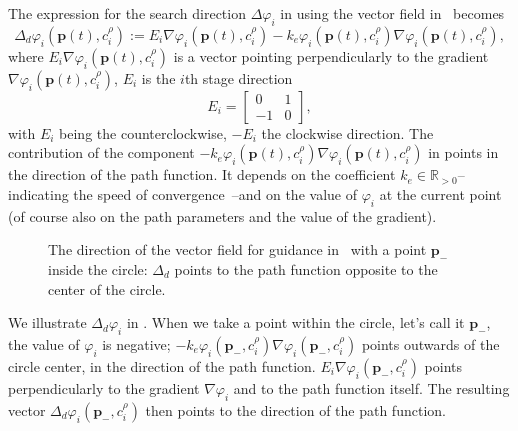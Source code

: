 The expression for the search direction $\Delta\varphi_i$ in  using the vector field in~\citep{de2017guidance} becomes
\begin{equation}\label{eq:pd}
  \Delta_d\varphi_i(\mathbf{p}(t),c_i^\rho):=E_i\nabla\varphi_i(\mathbf{p}(t),c_i^\rho)-k_e\varphi_i(\mathbf{p}(t),c_i^\rho)\nabla\varphi_i(\mathbf{p}(t),c_i^\rho),
\end{equation}
where $E_i\nabla\varphi_i(\mathbf{p}(t),c_i^\rho)$ is a vector pointing perpendicularly to the gradient $\nabla\varphi_i(\mathbf{p}(t),c_i^\rho)$, $E_i$ is the $i$th stage direction
\begin{equation}
  E_i=\begin{bmatrix}
    0&1\\-1&0
  \end{bmatrix},
\end{equation}
with $E_i$ being the counterclockwise, $-E_i$ the clockwise direction. 
The contribution of the component $-k_e\varphi_i(\mathbf{p}(t),c_i^\rho)\nabla\varphi_i(\mathbf{p}(t),c_i^\rho)$ in  points in the direction of the path function. It depends on the coefficient $k_e\in\mathbb{R}_{>0}$--indicating the speed of convergence~\citep{de2017guidance}--and on the value of $\varphi_i$ at the current point (of course also on the path parameters and the value of the gradient). 
\begin{figure}[h!]
  \centering
  \selectfont
  
  \caption[The direction of the vector field inside the path function]{The direction of the vector field for guidance in~\citep{de2017guidance} with a point $\mathbf{p}_{-}$ inside the circle: $\Delta_d$ points to the path function opposite to the center of the circle.}
  \label{fig:grad_gvf1}
\end{figure}
We illustrate $\Delta_d\varphi_i$ in . When we take a point within the circle, let's call it $\mathbf{p}_{-}$, the value of $\varphi_i$ is negative; $-k_e\varphi_i(\mathbf{p}_{-},c_i^\rho)\nabla\varphi_i(\mathbf{p}_{-},c_i^\rho)$ points outwards of the circle center, in the direction of the path function. $E_i\nabla\varphi_i(\mathbf{p}_{-},c_i^\rho)$ points perpendicularly to the gradient $\nabla\varphi_i$ and to the path function itself. The resulting vector $\Delta_d\varphi_i(\mathbf{p}_{-},c_i^\rho)$ then points to the direction of the path function.

